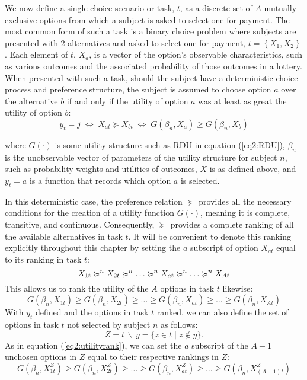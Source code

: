 \documentclass[../main.tex]{subfiles}
\begin{document}
We now define a single choice scenario or task, $t$, as a discrete set of $A$ mutually exclusive options from which a subject is asked to select one for payment.
The most common form of such a task is a binary choice problem where subjects are presented with 2 alternatives and asked to select one for payment, $t=\left\{X_1,X_2\right\}$ .
Each element of $t$, $X_a$, is a vector of the option's observable characteristics, such as various outcomes and the associated probability of those outcomes in a lottery.
When presented with such a task, should the subject have a deterministic choice process and preference structure, the subject is assumed to choose option $a$ over the alternative $b$ if and only if the utility of option $a$ was at least as great the utility of option $b$:
\begin{equation}
	\label{eq2:ychoice}
	y_t = j \;\Leftrightarrow\; X_{at} \succcurlyeq X_{bt} \;\Leftrightarrow\; G(\beta_n , X_a) \geq G(\beta_n , X_b)
\end{equation}

\noindent where $G(\cdot)$ is some utility structure such as RDU in equation (\ref{eq2:RDU}), $\beta_n$ is the unobservable vector of parameters of the utility structure for subject $n$, such as probability weights and utilities of outcomes, $X$ is as defined above, and $y_t=a$ is a function that records which option $a$ is selected.

In this deterministic case, the preference relation $\succcurlyeq$ provides all the necessary conditions for the creation of a utility function $G(\cdot)$, meaning it is complete, transitive, and continuous.
Consequently, $\succcurlyeq$ provides a complete ranking of all the available alternatives in task $t$.
It will be convenient to denote this ranking explicitly throughout this chapter by setting the $a$ subscript of option $X_{at}$ equal to its ranking in task $t$:
\begin{equation}
	\label{eq2:outcomerank}
	X_{1t} \succcurlyeq^n X_{2t} \succcurlyeq^n \ldots \succcurlyeq^n X_{at} \succcurlyeq^n \ldots \succcurlyeq^n X_{At}\\
\end{equation}
\noindent This allows us to rank the utility of the $A$ options in task $t$ likewise:
\begin{equation}
	\label{eq2:utilityrank}
	G(\beta_n,X_{1t}) \geq G(\beta_n,X_{2t}) \geq \ldots \geq G(\beta_n,X_{at}) \geq \ldots \geq G(\beta_n,X_{At})
\end{equation}
\noindent With $y_t$ defined and the options in task $t$ ranked, we can also define the set of options in task $t$ not selected by subject $n$ as follows:
\begin{equation}
	\label{eq2:emptyset}
	Z = t \,\backslash\, y = \{z \in t \;|\; z \notin y \}.
\end{equation}
\noindent As in equation (\ref{eq2:utilityrank}), we can set the $a$ subscript of the $A-1$ unchosen options in $Z$ equal to their respective rankings in $Z$:
\begin{equation}
	\label{eq2:Zutilityrank}
	G(\beta_n,X_{1t}^Z) \geq G(\beta_n,X_{2t}^Z) \geq \ldots \geq G(\beta_n,X_{at}^Z) \geq \ldots \geq G(\beta_n,X_{(A-1)t}^Z)
\end{equation}
\end{document}
